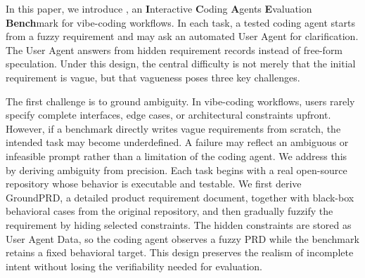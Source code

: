 
In this paper, we introduce \rcb{}, an \textbf{I}nteractive \textbf{C}oding \textbf{A}gents \textbf{E}valuation \textbf{Bench}mark for vibe-coding workflows.
In each task, a tested coding agent starts from a fuzzy requirement and may ask an automated User Agent for clarification. The User Agent answers from hidden requirement records instead of free-form speculation. Under this design, the central difficulty is not merely that the initial requirement is vague, but that vagueness poses three key challenges.

The first challenge is to ground ambiguity. In vibe-coding workflows, users rarely specify complete interfaces, edge cases, or architectural constraints upfront. However, if a benchmark directly writes vague requirements from scratch, the intended task may become underdefined. A failure may reflect an ambiguous or infeasible prompt rather than a limitation of the coding agent. We address this by deriving ambiguity from precision. Each task begins with a real open-source repository whose behavior is executable and testable. We first derive GroundPRD, a detailed product requirement document, together with black-box behavioral cases from the original repository, and then gradually fuzzify the requirement by hiding selected constraints. The hidden constraints are stored as User Agent Data, so the coding agent observes a fuzzy PRD while the benchmark retains a fixed behavioral target. This design preserves the realism of incomplete intent without losing the verifiability needed for evaluation.

